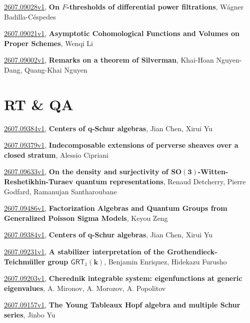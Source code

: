 \documentclass[9pt, a4paper]{article}
\theoremstyle{plain}
\theoremstyle{definition}
\theoremstyle{remark}
\newcommand{\arxiv}[3]{\href{https://arxiv.org/abs/#1}{#1}, \textbf{\textcolor{arxivblue}{#2}}, #3}
\begin{document}
\arxiv{2607.09028v1}{On $F$-thresholds of differential power filtrations}{Wágner Badilla-Céspedes}

\arxiv{2607.09021v1}{Asymptotic Cohomological Functions and Volumes on Proper Schemes}{Wenqi Li}

\arxiv{2607.09002v1}{Remarks on a theorem of Silverman}{Khai-Hoan Nguyen-Dang, Quang-Khai Nguyen}


\section{RT \& QA}
\arxiv{2607.09384v1}{Centers of q-Schur algebras}{Jian Chen, Xirui Yu}

\arxiv{2607.09379v1}{Indecomposable extensions of perverse sheaves over a closed stratum}{Alessio Cipriani}

\arxiv{2607.09633v1}{On the density and surjectivity of $\mathbf{SO(3)}$-Witten-Reshetikhin-Turaev quantum representations}{Renaud Detcherry, Pierre Godfard, Ramanujan Santharoubane}

\arxiv{2607.09486v1}{Factorization Algebras and Quantum Groups from Generalized Poisson Sigma Models}{Keyou Zeng}

\arxiv{2607.09384v1}{Centers of q-Schur algebras}{Jian Chen, Xirui Yu}

\arxiv{2607.09231v1}{A stabilizer interpretation of the Grothendieck-Teichmüller group $\mathsf{GRT}_1(\mathbf k)$}{Benjamin Enriquez, Hidekazu Furusho}

\arxiv{2607.09203v1}{Cherednik integrable system: eigenfunctions at generic eigenvalues}{A. Mironov, A. Morozov, A. Popolitov}

\arxiv{2607.09157v1}{The Young Tableaux Hopf algebra and multiple Schur series}{Jinbo Yu}

\end{document}
